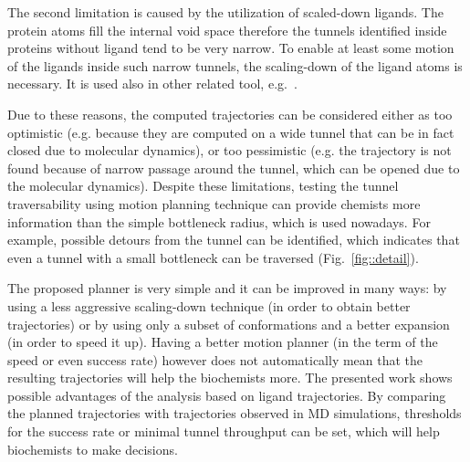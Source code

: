 \documentclass[letterpaper, 10 pt, conference]{ieeeconf} %
\begin{document}
The second limitation is caused by the utilization of scaled-down ligands.
The protein atoms fill the internal void space therefore the tunnels identified inside proteins without ligand tend
to be very narrow.
To enable at least some motion of the ligands inside such narrow tunnels, the scaling-down of the ligand atoms is necessary.
It is used also in other related tool, e.g.~\cite{cortes2005path}.

Due to these reasons, the computed trajectories can be considered either as too optimistic
(e.g. because they are computed on a wide tunnel that can be in fact closed due to molecular dynamics),
or too pessimistic (e.g. the trajectory is not found because of narrow passage around the tunnel, which can be 
opened due to the molecular dynamics).
Despite these limitations, testing the tunnel traversability using motion planning technique can provide chemists more information
than the simple bottleneck radius, which is used nowadays.
For example, possible detours from the tunnel can be identified, which indicates that even a tunnel with a small
bottleneck can be traversed (Fig.~\ref{fig::detail}).


The proposed planner is very simple and it can be improved in many ways: by using a less aggressive scaling-down technique (in order
to obtain better trajectories) or by using only a subset of conformations and a better expansion (in order to speed it up).
Having a better motion planner (in the term of the speed or even success rate) however does not automatically mean that the resulting trajectories will help the biochemists more.
The presented work shows possible advantages of the analysis based on ligand trajectories.
By comparing the planned trajectories with trajectories observed in MD simulations, thresholds for the success rate or minimal tunnel throughput can be set, which will help biochemists to make decisions.
\end{document}
